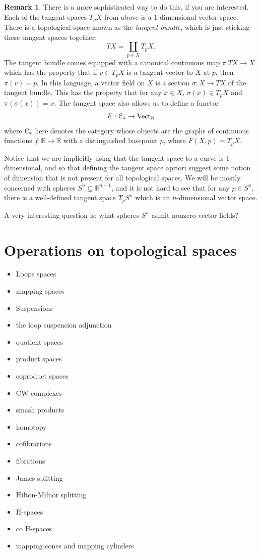 \documentclass[10pt]{amsart}
\newcommand{\euscr}[1]{\EuScript{#1}}
\theoremstyle{definition}
\newtheorem{rmk}[thm]{Remark}
\newcommand{\cdef}[1]{\textcolor{Bittersweet}{#1}}
\begin{document}
\begin{rmk}
    There is a more sophisticated way to do this, if you are interested. Each of the tangent spaces $T_pX$ from above is a 1-dimensional vector space. There is a topological space known as the \cdef{\emph{tangent bundle}}, which is just sticking these tangent spaces together:
    \[TX = \coprod_{p \in X}T_pX.\]
    The tangent bundle comes equipped with a canonical continuous map $\pi_:TX \to X$ which has the property that if $v \in T_pX$ is a tangent vector to $X$ at $p$, then $\pi(v)=p$. In this language, a vector field on $X$ is a section $\sigma:X \to TX$ of the tangent bundle. This has the property that for any $x \in X$, $\sigma(x) \in T_pX$ and $\pi(\sigma(x)) = x$. The tangent space also allows us to define a functor
    \[F: \euscr{C}_* \to \text{Vect}_{\mathbb{R}}\]
    where $\euscr{C}_*$ here denotes the category whose objects are the graphs of continuous functions $f:\mathbb{R} \to \mathbb{R}$ with a distinguished basepoint $p$, where $F(X, p) = T_pX$.
\end{rmk}

Notice that we are implicitly using that the tangent space to a curve is 1-dimensional, and so that defining the tangent space apriori suggest some notion of dimension that is not present for all topological spaces. We will be mostly concerned with spheres $S^n \subseteq \mathbb{R}^{n-1}$, and it is not hard to see that for any $p \in S^{n}$, there is a well-defined tangent space $T_pS^n$ which is an $n$-dimensional vector space.

A very interesting question is: what spheres $S^n$ admit nonzero vector fields?


\section{Operations on topological spaces}
\begin{itemize}
    \item Loops spaces
    \item mapping spaces
    \item Suspensions
    \item the loop suspension adjunction
    \item quotient spaces
    \item product spaces
    \item coproduct spaces
    \item CW complexes
    \item smash products
    \item homotopy
    \item cofibrations
    \item fibrations
    \item James splitting
    \item Hilton-Milnor splitting
    \item H-spaces
    \item co H-spaces
    \item mapping cones and mapping cylinders
\end{itemize}
\end{document}
